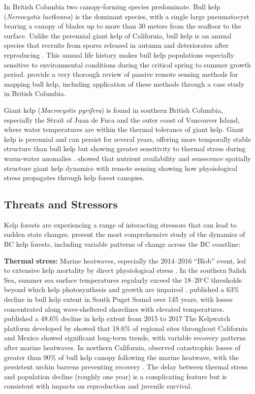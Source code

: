 \documentclass[12pt,oneside]{book}
\begin{document}
In British Columbia two canopy-forming species predominate. Bull kelp (\textit{Nereocystis luetkeana}) is the dominant species, with a single large pneumatocyst bearing a canopy of blades up to more than 30 meters from the seafloor to the surface. Unlike the perennial giant kelp of California, bull kelp is an annual species that recruits from spores released in autumn and deteriorates after reproducing \citep{Springer2007}. This annual life history makes bull kelp populations especially sensitive to environmental conditions during the critical spring to summer growth period. \citet{Schroeder2019} provide a very thorough review of passive remote sensing methods for mapping bull kelp, including application of these methods through a case study in British Columbia.

Giant kelp (\textit{Macrocystis pyrifera}) is found in southern British Columbia, especially the Strait of Juan de Fuca and the outer coast of Vancouver Island, where water temperatures are within the thermal tolerance of giant kelp. Giant kelp is perennial and can persist for several years, offering more temporally stable structure than bull kelp but showing greater sensitivity to thermal stress during warm-water anomalies \citep{Cavanaugh2019}. \citet{ BellSiegel2022} showed that nutrient availability and senescence spatially structure giant kelp dynamics with remote sensing showing how physiological stress propagates through kelp forest canopies.

\subsection{Threats and Stressors}
\label{subsec:threats}

Kelp forests are experiencing a range of interacting stressors that can lead to sudden state changes. \citet{Starko2024} present the most comprehensive study of the dynamics of BC kelp forests, including variable patterns of change across the BC coastline:

\textbf{Thermal stress:} Marine heatwaves, especially the 2014--2016 ``Blob'' event, led to extensive kelp mortality by direct physiological stress \citep{Bond2015, DiLorenzoMantua2016, Smale2019}. In the southern Salish Sea, summer sea surface temperatures regularly exceed the 18--20$^\circ$C thresholds beyond which kelp photosynthesis and growth are impaired \citep{MoraSoto2024}. \citet{Berry2021} published a 63\% decline in bull kelp extent in South Puget Sound over 145 years, with losses concentrated along wave-sheltered shorelines with elevated temperatures. \citet{Schroeder2020} published a 48.6\% decline in kelp extent from 2015 to 2017 The Kelpwatch platform developed by \citet{Bell2023} showed that 18.6\% of regional sites throughout California and Mexico showed significant long-term trends, with variable recovery patterns after marine heatwaves. In northern California, \citet{RogersBennett2019} observed catastrophic losses of greater than 90\% of bull kelp canopy following the marine heatwave, with the persistent urchin barrens preventing recovery \citep{McPherson2021}. The delay between thermal stress and population decline (roughly one year) is a complicating feature but is consistent with impacts on reproduction and juvenile survival.
\end{document}

